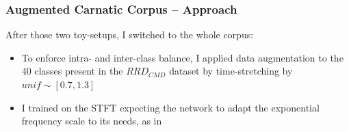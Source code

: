 \documentclass[hyperref={pdfpagelabels=false}]{beamer}
\begin{document}
\begin{frame}
  \frametitle{Augmented Carnatic Corpus -- Approach}
  After those two toy-setups, I switched to the whole corpus:
  \begin{itemize}
  \item \scriptsize To enforce intra- and inter-class balance, I applied data augmentation to the 40 classes present in the $RRD_{CMD}$ dataset by time-stretching by $unif \sim [0.7, 1.3]$
  \item \scriptsize I trained on the STFT expecting the network to adapt the exponential frequency scale to its needs, as in \cite{wavspaper}
  \end{itemize}
\vspace{-3mm}
  \begin{columns}
         \begin{table}
           \centering
         \end{table}


\end{columns}
\end{frame}
\end{document}
